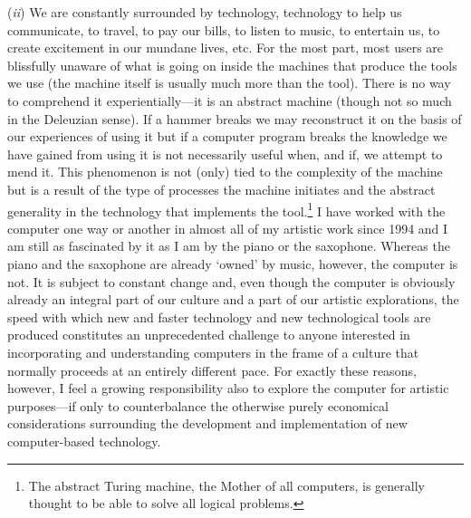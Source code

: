 \noindent (\emph{ii}) We are constantly surrounded by technology, technology to help us communicate, to travel, to pay our bills, to listen to music, to entertain us, to create excitement in our mundane lives, etc. For the most part, most users are blissfully unaware of what is going on inside the machines that produce the tools we use (the machine itself is usually much more than the tool). There is no way to comprehend it experientially---it is an abstract machine (though not so much in the Deleuzian sense). If a hammer breaks we may reconstruct it on the basis of our experiences of using it but if a computer program breaks the knowledge we have gained from using it is not necessarily useful when, and if, we attempt to mend it. This phenomenon is not (only) tied to the complexity of the machine but is a result of the type of processes the machine initiates and the abstract generality in the technology that implements the tool.\footnote{The abstract Turing machine, the Mother of all computers, is generally thought to be able to solve all logical problems.} I have worked with the computer one way or another in almost all of my artistic work since 1994 and I am still as fascinated by it as I am by the piano or the saxophone. Whereas the piano and the saxophone are already `owned' by music, however, the computer is not. It is subject to constant change and, even though the computer is obviously already an integral part of our culture and a part of our artistic explorations, the speed with which new and faster technology and new technological tools are produced constitutes an unprecedented challenge to anyone interested in incorporating and understanding computers in the frame of a culture that normally proceeds at an entirely different pace. For exactly these reasons, however, I feel a growing responsibility also to explore the computer for artistic purposes---if only to counterbalance the otherwise purely economical considerations surrounding the development and implementation of new computer-based technology. 

